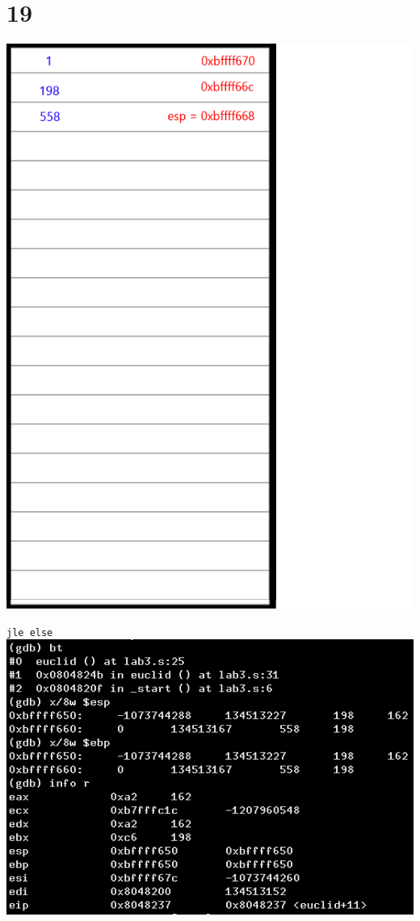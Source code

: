 \documentclass{article}
\begin{document}
\section*{19}
\begin{minipage}{5cm}
\includegraphics[scale=0.3]{s3.png}
\end{minipage}
\begin{minipage}{8cm}
\verb|jle else|\\
\includegraphics[scale=0.4]{bxi19.png} \\
\end{minipage}
\clearpage
\end{document}
